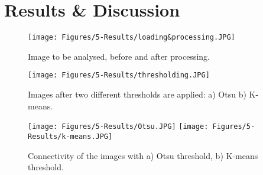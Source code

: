 \section{Results \& Discussion}

\begin{figure}[h] %
    \centering
    \texttt{[image: Figures/5-Results/loading\&processing.JPG]}
    \caption{Image to be analysed, before and after processing.}
    \label{fig:limitationrhcf}
\end{figure}


\begin{figure}[h] %
    \centering
    \texttt{[image: Figures/5-Results/thresholding.JPG]}
    \caption{Images after two different thresholds are applied: a) Otsu b) K-means.}
    \label{fig:limitationrhcf}
\end{figure}


\begin{figure}[h] %
    \centering
    \texttt{[image: Figures/5-Results/Otsu.JPG]}
    \texttt{[image: Figures/5-Results/k-means.JPG]}
    \caption{Connectivity of the images with a) Otsu threshold, b) K-means threshold.}
    \label{fig:limitationrhcf}
\end{figure}

